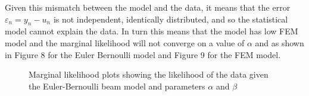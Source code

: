 \documentclass{article}
\begin{document}
Given this mismatch between the model and the data, it means that the error $\varepsilon_n = y_n - u_n$ is not independent, identically distributed, and so the statistical model cannot explain the data. In turn this means that the model has low FEM model and the marginal likelihood will not converge on a value of $\alpha$ and as shown in Figure 8 for the Euler Bernoulli model and Figure 9 for the FEM model.
\begin{figure}[H]%
	\centering
	\qquad
	\qquad
	\caption{Marginal likelihood plots showing the likelihood of the data given the Euler-Bernoulli beam model and parameters $\alpha$ and $\beta$}%
	\label{fig:example}%
\end{figure}
\end{document}
